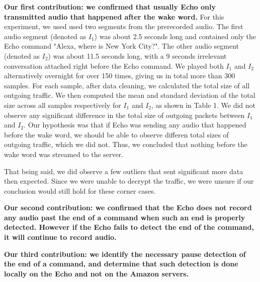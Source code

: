 \textbf{Our first contribution: we confirmed that usually Echo only transmitted audio that happened after the wake word.} For this experiment, we used used two segments from the prerecorded audio. The first audio segment (denoted as $I_1$) was about 2.5 seconds long and contained only the Echo command "Alexa, where is New York City?". The other audio segment (denoted as $I_2$) was about 11.5 seconds long, with a 9 seconds irrelevant conversation attached right before the Echo command. We played both $I_1$ and $I_2$ alternatively overnight for over 150 times, giving us in total more than 300 samples. For each sample, after data cleaning, we calculated the total size of all outgoing traffic. We then computed the mean and standard deviation of the total size across all samples respectively for $I_1$ and $I_2$, as shown in Table 1. We did not observe any significant difference in the total size of outgoing packets between $I_1$ and $I_2$. Our hypothesis was that if Echo was sending any audio that happened before the wake word, we should be able to observe differen total sizes of outgoing traffic, which we did not. Thus, we concluded that nothing before the wake word was streamed to the server.

That being said, we did observe a few outliers that sent significant more data then expected. Since we were unable to decrypt the traffic, we were unsure if our conclusion would still hold for these corner cases.

\textbf{Our second contribution: we confirmed that the Echo does not record any audio past the end of a command when such an end is properly detected. However if the Echo fails to detect the end of the command, it will continue to record audio.}

\textbf{Our third contribution: we identify the necessary pause detection of the end of a command, and determine that such detection is done locally on the Echo and not on the Amazon servers.}






